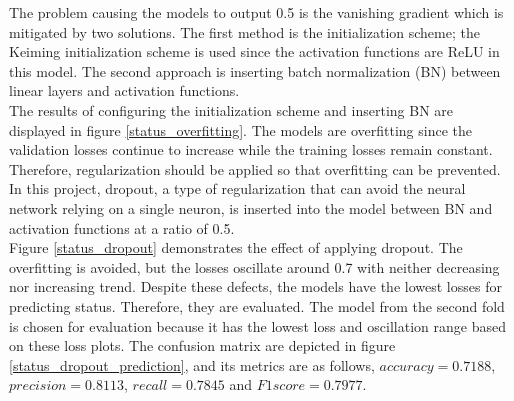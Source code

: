 \documentclass[12pt,twoside]{report}
\begin{document}
The problem causing the models to output 0.5 is the vanishing gradient which is mitigated by two solutions. The first method is the initialization scheme; the Keiming initialization scheme is used since the activation functions are ReLU in this model. The second approach is inserting batch normalization (BN) between linear layers and activation functions. 
\\

The results of configuring the initialization scheme and inserting BN are displayed in figure \ref{status_overfitting}. The models are overfitting since the validation losses continue to increase while the training losses remain constant. Therefore, regularization should be applied so that overfitting can be prevented. In this project, dropout, a type of regularization that can avoid the neural network relying on a single neuron, is inserted into the model between BN and activation functions at a ratio of 0.5. 
\\

Figure \ref{status_dropout} demonstrates the effect of applying dropout. The overfitting is avoided, but the losses oscillate around 0.7 with neither decreasing nor increasing trend. Despite these defects, the models have the lowest losses for predicting status. Therefore, they are evaluated. The model from the second fold is chosen for evaluation because it has the lowest loss and oscillation range based on these loss plots. The confusion matrix are depicted in figure \ref{status_dropout_prediction}, and its metrics are as follows, $accuracy = 0.7188$, $precision = 0.8113$, $recall = 0.7845$ and $F1 score = 0.7977$.
\\
\end{document}
